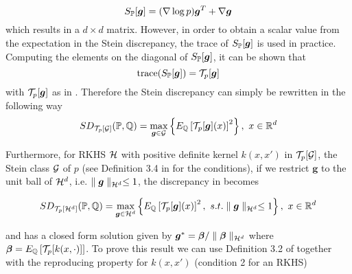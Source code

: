 \begin{equation*}
S_{\mathbb{P}}[\boldsymbol{g}] = (\nabla\log p) \boldsymbol{g}^T + \nabla\boldsymbol{g}
\end{equation*}
which results in a $d \times d$ matrix. However, in order to obtain a scalar value from the expectation in the Stein discrepancy, the trace of $S_{\mathbb{P}}[\boldsymbol{g}]$ is used in practice. Computing the elements on the diagonal of $S_{\mathbb{P}}[\boldsymbol{g}]$, it can be shown that 
\begin{equation*}
\text{trace}(S_{\mathbb{P}}[\boldsymbol{g}]) = \mathcal{T}_p[\boldsymbol{g}]
\end{equation*}
with $\mathcal{T}_p[\boldsymbol{g}]$ as in . Therefore the Stein discrepancy can simply be rewritten in the following way
\begin{equation}\label{stein_discrepancy_vector}
SD_{\mathcal{T}_p[\mathcal{G}]}(\mathbb{P}, \mathbb{Q}) = \max_{\boldsymbol{g} \in \mathcal{G}}\left\{E_{\mathbb{Q}}\left[\mathcal{T}_{p}[\boldsymbol{g}](x)\right]^2\right \}, \ x \in \mathbb{R}^d
\end{equation}

Furthermore, for RKHS $\mathcal{H}$ with positive definite kernel $k(x, x')$ in $\mathcal{T}_{p}[\mathcal{G}]$, the Stein class $\mathcal{G}$ of $p$ (see Definition 3.4 in \cite{liu2016kernelized} for the conditions), if we restrict $\boldsymbol{g}$ to the unit ball of $\mathcal{H}^d$, i.e. $\parallel \boldsymbol{g} \parallel_{\mathcal{H}^d} \leq 1$, the discrepancy in  becomes

\begin{equation}\label{stein_discrepancy_rkhs}
SD_{\calT_p[\calH^d]}(\bbP, \bbQ) = \max_{\boldsymbol{g} \in \calH^d}\left\{E_{\bbQ}\left[\calT_{p}[\boldsymbol{g}](x)\right]^2, \ s.t. \parallel \boldsymbol{g}\parallel_{\calH^d} \leq 1\right \},\ x \in \bbR^d
\end{equation}

and has a closed form solution given by $\boldsymbol{g}^* = \boldsymbol{\beta}/\parallel \boldsymbol{\beta} \parallel_{\mathcal{H}^d}$ where $\boldsymbol{\beta} = E_{\mathbb{Q}}\left[\mathcal{T}_p[k(x, \cdot)]\right]$. To prove this result we can use Definition 3.2 of \cite{liu2016kernelized} together with the reproducing property for $k(x, x')$ (condition 2 for an RKHS)


